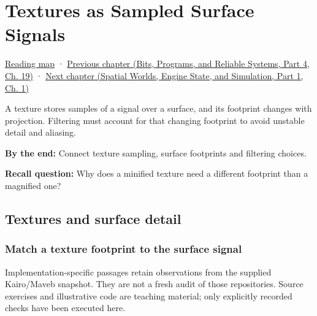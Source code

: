 \chapter{Textures as Sampled Surface Signals}\label{03-visual-computing-i-ch019-textures-as-sampled-surface-signals}\hypertarget{03-visual-computing-i-ch019}{}\label{stagechapter:03-visual-computing-i-ch019}

\hypertarget{03-visual-computing-i-ch019-textures-as-sampled-surface-signals}{}

\hyperref[volume-reading-map]{Reading map} · \href{../01-Bits-Programs-and-Reliable-Systems-P04/main.pdf\#nameddest=03-visual-computing-i-ch018-c-representation-ownership-and-lifetime}{Previous chapter (Bits, Programs, and Reliable Systems, Part 4, Ch. 19)} · \href{../05-Spatial-Worlds-Engine-State-and-Simulation-P01/main.pdf\#nameddest=03-visual-computing-i-ch020-geometry-queries-from-scene-to-contact}{Next chapter (Spatial Worlds, Engine State, and Simulation, Part 1, Ch. 1)}

A texture stores samples of a signal over a surface, and its footprint changes with projection. Filtering must account for that changing footprint to avoid unstable detail and aliasing.

\textbf{By the end:} Connect texture sampling, surface footprints and filtering choices.

\textbf{Recall question:} Why does a minified texture need a different footprint than a magnified one?

\section{Textures and surface detail}\label{03-visual-computing-i-ch019-textures-and-surface-detail}

\hypertarget{03-visual-computing-i-ch019-textures-and-surface-detail}{}

\subsection{Match a texture footprint to the surface signal}\label{03-visual-computing-i-ch019-match-a-texture-footprint-to-the-surface-signal}

\hypertarget{03-visual-computing-i-ch019-match-a-texture-footprint-to-the-surface-signal}{}

Implementation-specific passages retain observations from the supplied Kairo/Maveb snapshot. They are not a fresh audit of those repositories. Source exercises and illustrative code are teaching material; only explicitly recorded checks have been executed here.

